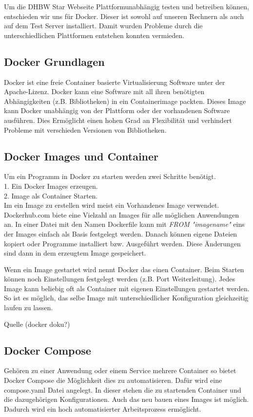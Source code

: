 Um die DHBW Star Webseite Plattformunabhängig testen und betreiben können, entschieden wir uns für Docker. Dieser ist sowohl auf unseren Rechnern als auch auf dem Test Server installiert. Damit wurden Probleme durch die unterschiedlichen Plattformen entstehen konnten vermieden.

\subsection{Docker Grundlagen}

Docker ist eine freie Container basierte Virtualisierung Software unter der Apache-Lizenz.
Docker kann eine Software mit all ihren benötigten Abhängigkeiten (z.B. Bibliotheken) in ein Containerimage packten. Dieses Image kann Docker unabhängig von der Plattform oder der vorhandenen Software ausführen. Dies Ermöglicht einen hohen Grad an Flexibilität und verhindert Probleme mit verschieden Versionen von Bibliotheken.

\subsection{Docker Images und Container}
Um ein Programm in Docker zu starten werden zwei Schritte benötigt.\\
1. Ein Docker Images erzeugen.\\
2. Image als Container Starten.\\
Im ein Image zu erstellen wird meist ein Vorhandenes Image verwendet. Dockerhub.com biete eine Vielzahl an Images für alle möglichen Anwendungen an.
In einer Datei mit den Namen Dockerfile kann mit \emph{FROM "imagename"} eins der Images einfach als Basis festgelegt werden. Danach können eigene Dateien kopiert oder Programme installiert bzw. Ausgeführt werden. Diese Änderungen sind dann in dem erzeugtem Image gespeichert.

Wenn ein Image gestartet wird nennt Docker das einen Container.
Beim Starten können noch Einstellungen festgelegt werden (z.B. Port Weiterleitung).
Jedes Image kann beliebig oft als Container mit eigenen Einstellungen gestartet werden. So ist es möglich, das selbe Image mit unterschiedlicher Konfiguration gleichzeitig laufen zu lassen.

\todo Quelle (docker doku?)

\subsection{Docker Compose}
Gehören zu einer Anwendung oder einem Service mehrere Container so bietet Docker Compose die Möglichkeit dies zu automatisieren. Dafür wird eine compose.yaml Datei angelegt. In dieser stehen die zu startenden Container und die dazugehörigen Konfigurationen.
Auch das neu bauen eines Images ist möglich. Dadurch wird ein hoch automatisierter Arbeitsprozess ermöglicht.

